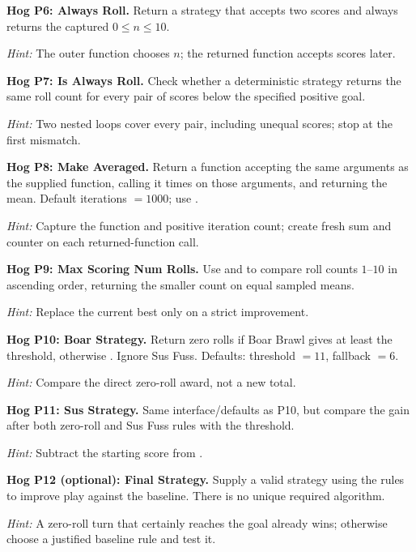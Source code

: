 \begin{prob}
\textbf{Hog P6: Always Roll.} Return a strategy that accepts two scores and always returns the captured $0\le n\le10$.\par
\emph{Hint:} The outer function chooses $ n $; the returned function accepts scores later.
\end{prob}
\begin{prob}
\textbf{Hog P7: Is Always Roll.} Check whether a deterministic strategy returns the same roll count for every pair of scores below the specified positive goal.\par
\emph{Hint:} Two nested loops cover every pair, including unequal scores; stop at the first mismatch.
\end{prob}
\begin{prob}
\textbf{Hog P8: Make Averaged.} Return a function accepting the same arguments as the supplied function, calling it  times on those arguments, and returning the mean. Default iterations $=1000$; use .\par
\emph{Hint:} Capture the function and positive iteration count; create fresh sum and counter on each returned-function call.
\end{prob}
\begin{prob}
\textbf{Hog P9: Max Scoring Num Rolls.} Use  and  to compare roll counts $1$--$10$ in ascending order, returning the smaller count on equal sampled means.\par
\emph{Hint:} Replace the current best only on a strict improvement.
\end{prob}
\begin{prob}
\textbf{Hog P10: Boar Strategy.} Return zero rolls if Boar Brawl gives at least the threshold, otherwise . Ignore Sus Fuss. Defaults: threshold $=11$, fallback $=6$.\par
\emph{Hint:} Compare the direct zero-roll award, not a new total.
\end{prob}
\begin{prob}
\textbf{Hog P11: Sus Strategy.} Same interface/defaults as P10, but compare the gain after both zero-roll and Sus Fuss rules with the threshold.\par
\emph{Hint:} Subtract the starting score from .
\end{prob}
\begin{prob}
\textbf{Hog P12 (optional): Final Strategy.} Supply a valid strategy using the rules to improve play against the baseline. There is no unique required algorithm.\par
\emph{Hint:} A zero-roll turn that certainly reaches the goal already wins; otherwise choose a justified baseline rule and test it.
\end{prob}

